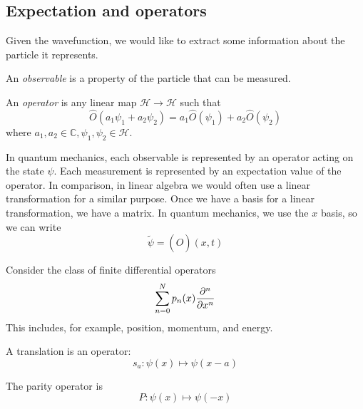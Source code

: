 \subsection{Expectation and operators}
Given the wavefunction, we would like to extract some information about the particle it represents.
\begin{definition}
	An \textit{observable} is a property of the particle that can be measured.
\end{definition}
\begin{definition}
	An \textit{operator} is any linear map \( \mathcal H \to \mathcal H \) such that
	\[
		\hat O(a_1 \psi_1 + a_2 \psi_2) = a_1 \hat O(\psi_1) + a_2 \hat O(\psi_2)
	\]
	where \( a_1, a_2 \in \mathbb C, \psi_1, \psi_2 \in \mathcal H \).
\end{definition}
\noindent In quantum mechanics, each observable is represented by an operator acting on the state \( \psi \).
Each measurement is represented by an expectation value of the operator.
In comparison, in linear algebra we would often use a linear transformation for a similar purpose.
Once we have a basis for a linear transformation, we have a matrix.
In quantum mechanics, we use the \( x \) basis, so we can write
\[
	\widetilde \psi = (\hat O)(x, t)
\]
\begin{example}
	Consider the class of finite differential operators
	\[
		\sum_{n=0}^N p_n(x) \pdv[n]{x}
	\]
	This includes, for example, position, momentum, and energy.
\end{example}
\begin{example}
	A translation is an operator:
	\[
		s_a \colon \psi(x) \mapsto \psi(x-a)
	\]
\end{example}
\begin{example}
	The parity operator is
	\[
		P \colon \psi(x) \mapsto \psi(-x)
	\]
\end{example}

